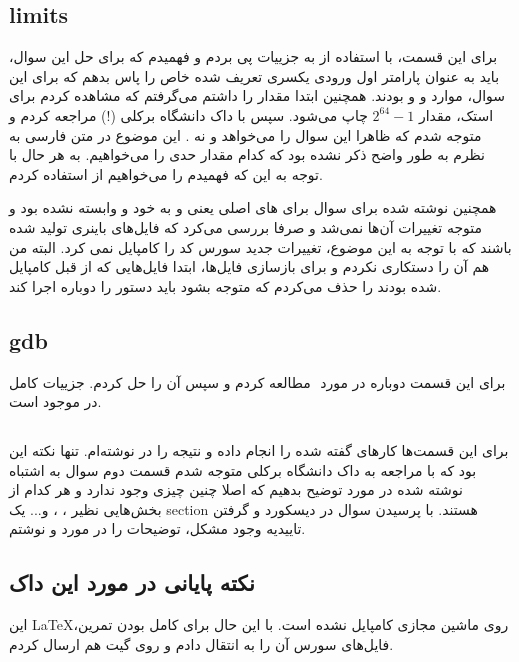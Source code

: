 \documentclass[12pt]{article}
\begin{document}
\subsection{limits}

برای این قسمت، با استفاده از  به جزییات  پی بردم و فهمیدم که برای حل این سوال، باید به عنوان پارامتر اول ورودی یکسری  تعریف شده خاص را پاس بدهم که برای این سوال، موارد  و  و  بودند. همچنین ابتدا مقدار  را داشتم می‌گرفتم که مشاهده کردم برای استک، مقدار
$2^{64}-1$
چاپ می‌شود. سپس با داک دانشگاه برکلی (!) مراجعه کردم و متوجه شدم که ظاهرا این سوال  را می‌خواهد و نه . این موضوع در متن فارسی به نظرم به طور واضح ذکر نشده بود که کدام مقدار حدی را می‌خواهیم. به هر حال با توجه به این که فهمیدم  را می‌خواهیم  از  استفاده کردم.

همچنین  نوشته شده برای سوال برای  های اصلی یعنی  و  به خود  و  وابسته نشده بود و متوجه تغییرات آن‌ها نمی‌شد و صرفا بررسی می‌کرد که فایل‌های باینری تولید شده باشند که با توجه به این موضوع، تغییرات جدید سورس کد را کامپایل نمی کرد. البته من هم آن را دستکاری نکردم و برای بازسازی فایل‌ها، ابتدا فایل‌هایی که از قبل کامپایل شده بودند را حذف می‌کردم که متوجه بشود باید دستور را دوباره اجرا کند.

\subsection{gdb}

برای این قسمت دوباره در مورد ‌ مطالعه کردم و سپس آن را حل کردم. جزییات کامل در  موجود است.


\subsection{}


برای این قسمت‌ها کارهای گفته شده را انجام داده و نتیجه را در  نوشته‌ام. تنها نکته این بود که با مراجعه به داک دانشگاه برکلی متوجه شدم قسمت دوم سوال به اشتباه نوشته شده در مورد  توضیح بدهیم که اصلا چنین چیزی وجود ندارد و هر کدام از بخش‌هایی نظیر ، ،  و... یک section هستند. با پرسیدن سوال در دیسکورد و گرفتن تاییدیه وجود مشکل، توضیحات را در مورد  و  نوشتم.




\subsection{نکته پایانی در مورد این داک}
این \LaTeX روی ماشین مجازی کامپایل نشده است. با این حال برای کامل بودن تمرین، فایل‌های سورس آن را به  انتقال دادم و روی گیت هم ارسال کردم.
\end{document}
